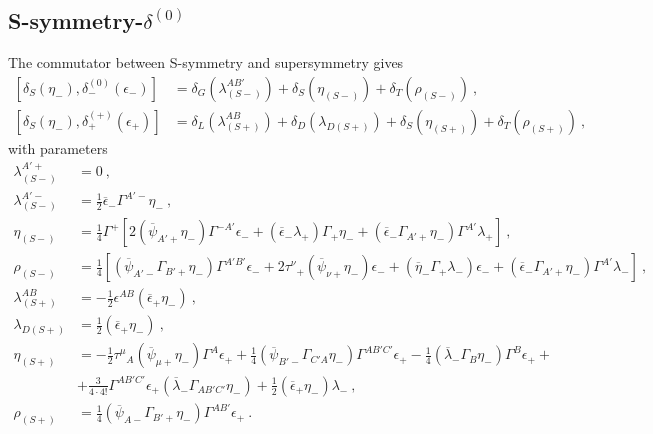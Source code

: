 \documentclass[a4paper,10pt,openany]{article}
\begin{document}
	\subsection[S-symmetry-$\delta^{(0)}$]{S-symmetry-\boldmath $\delta^{(0)}$}
	The commutator between S-symmetry and supersymmetry gives
	\begin{subequations}
		\begin{align}
			[\delta_{S}(\eta_{-}),\delta_{-}^{(0)}(\epsilon_{-})]&=\delta_{G}(\lambda_{(S-)}^{AB'})+\delta_{S}(\eta_{(S-)})+\delta_{T}(\rho_{(S-)})\ , \\
			[\delta_{S}(\eta_{-}),\delta_{+}^{(+)}(\epsilon_{+})]&=\delta_{L}(\lambda_{(S+)}^{AB})+\delta_{D}(\lambda_{D(S+)})+\delta_{S}(\eta_{(S+)})+\delta_{T}(\rho_{(S+)})\ ,\label{eq:Ssusy}
		\end{align}
	\end{subequations}
	with parameters
	\begin{subequations}
		\begin{align}
			\lambda_{(S-)}^{A'+}&=0\ , \\
			\lambda_{(S-)}^{A'-}&=\frac{1}{2}\overline{\epsilon}_{-}\Gamma^{A'-}\eta_{-}\ , \\
			\eta_{(S-)}&=\frac{1}{4}\Gamma^{+}[2(\overline{\psi}_{A'+}\eta_{-})\Gamma^{-A'}\epsilon_{-}+(\overline{\epsilon}_{-}\lambda_{+})\Gamma_{+}\eta_{-}+(\overline{\epsilon}_{-}\Gamma_{A'+}\eta_{-})\Gamma^{A'}\lambda_{+}]\ , \\
			\rho_{(S-)}&=\frac{1}{4}[(\overline{\psi}_{A'-}\Gamma_{B'+}\eta_{-})\Gamma^{A'B'}\epsilon_{-}+2\tau^{\nu}{}_{+}(\overline{\psi}_{\nu +}\eta_{-})\epsilon_{-}+(\overline{\eta}_{-}\Gamma_{+}\lambda_{-})\epsilon_{-}+(\overline{\epsilon}_{-}\Gamma_{A'+}\eta_{-})\Gamma^{A'}\lambda_{-}]\ , \\
			\lambda_{(S+)}^{AB}&=-\frac{1}{2}\epsilon^{AB}(\overline{\epsilon}_{+}\eta_{-})\ , \\
			\lambda_{D(S+)}&=\frac{1}{2}(\overline{\epsilon}_{+}\eta_{-})\ , \\
			\eta_{(S+)}&=-\frac{1}{2}\tau^{\mu}{}_{A}(\overline{\psi}_{\mu +}\eta_{-})\Gamma^{A}\epsilon_{+}+\frac{1}{4}(\overline{\psi}_{B'-}\Gamma_{C'A}\eta_{-})\Gamma^{AB'C'}\epsilon_{+}-\frac{1}{4}(\overline{\lambda}_{-}\Gamma_{B}\eta_{-})\Gamma^{B}\epsilon_{+}+\nonumber\\
			&+\frac{3}{4\cdot 4!}\Gamma^{AB'C'}\epsilon_{+}(\overline{\lambda}_{-}\Gamma_{AB'C'}\eta_{-})+\frac{1}{2}(\overline{\epsilon}_{+}\eta_{-})\lambda_{-}\ , \\
			\rho_{(S+)}&=\frac{1}{4}(\overline{\psi}_{A-}\Gamma_{B'+}\eta_{-})\Gamma^{AB'}\epsilon_{+}\ .
		\end{align}
	\end{subequations}
\end{document}
